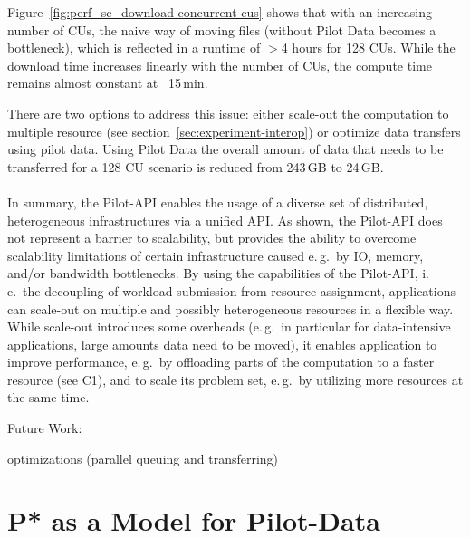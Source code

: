 \documentclass[conference]{IEEEtran}
\begin{document}
Figure~\ref{fig:perf_sc_download-concurrent-cus} shows that with an increasing
number of CUs, the naive way of moving files (without Pilot Data becomes a 
bottleneck), which is reflected in a runtime of $>$4 hours for 128 CUs. While 
the download time increases linearly with the number of CUs, the compute time 
remains almost constant at ~15\,min.

There are two options to address this issue: either scale-out the computation 
to multiple resource (see section~\ref{sec:experiment-interop}) or optimize 
data transfers using pilot data. Using Pilot Data the overall amount of data 
that needs to be transferred for a 128 CU scenario is reduced from 243\,GB to 
24\,GB.\\
\\

In summary, the Pilot-API enables the usage of a diverse set of distributed,
heterogeneous infrastructures via a unified API. As shown, the Pilot-API does
not represent a barrier to scalability, but provides the ability to overcome
scalability limitations of certain infrastructure caused e.\,g.\ by IO,
memory, and/or bandwidth bottlenecks. By using the capabilities of the
Pilot-API, i.\,e.\ the decoupling of workload submission from resource
assignment, applications can scale-out on multiple and possibly heterogeneous
resources in a flexible way. While scale-out introduces some overheads
(e.\,g.\ in particular for data-intensive applications, large amounts data
need to be moved), it enables application to improve performance, e.\,g.\ by
offloading parts of the computation to a faster resource (see C1), and to
scale its problem set, e.\,g.\ by utilizing more resources at the same time.

Future Work:

optimizations (parallel queuing and transferring)



\section{P* as a Model for Pilot-Data}
\label{sec:pilot-data}
\end{document}
